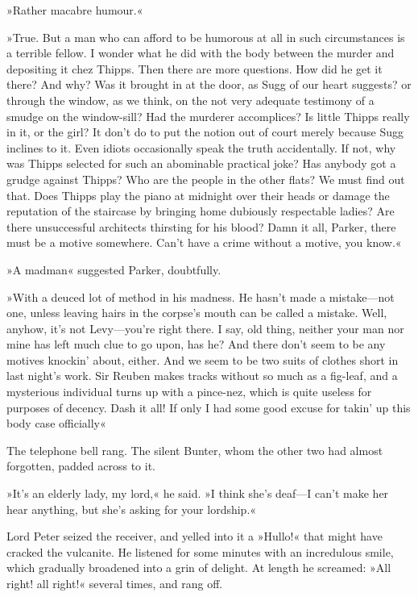 »Rather macabre humour.«

»True. But a man who can afford to be humorous at all in such circumstances is a terrible fellow. I wonder what he did with the body between the murder and depositing it chez Thipps. Then there are more questions. How did he get it there? And why? Was it brought in at the door, as Sugg of our heart suggests? or through the window, as we think, on the not very adequate testimony of a smudge on the window-sill? Had the murderer accomplices? Is little Thipps really in it, or the girl? It don't do to put the notion out of court merely because Sugg inclines to it. Even idiots occasionally speak the truth accidentally. If not, why was Thipps selected for such an abominable practical joke? Has anybody got a grudge against Thipps? Who are the people in the other flats? We must find out that. Does Thipps play the piano at midnight over their heads or damage the reputation of the staircase by bringing home dubiously respectable ladies? Are there unsuccessful architects thirsting for his blood? Damn it all, Parker, there must be a motive somewhere. Can't have a crime without a motive, you know.«

»A madman\longdash« suggested Parker, doubtfully.

»With a deuced lot of method in his madness. He hasn't made a mistake—not one, unless leaving hairs in the corpse's mouth can be called a mistake. Well, anyhow, it's not Levy—you're right there. I say, old thing, neither your man nor mine has left much clue to go upon, has he? And there don't seem to be any motives knockin' about, either. And we seem to be two suits of clothes short in last night's work. Sir Reuben makes tracks without so much as a fig-leaf, and a mysterious individual turns up with a pince-nez, which is quite useless for purposes of decency. Dash it all! If only I had some good excuse for takin' up this body case officially\longdash«

The telephone bell rang. The silent Bunter, whom the other two had almost forgotten, padded across to it.

»It's an elderly lady, my lord,« he said. »I think she's deaf—I can't make her hear anything, but she's asking for your lordship.«

Lord Peter seized the receiver, and yelled into it a »Hullo!« that might have cracked the vulcanite. He listened for some minutes with an incredulous smile, which gradually broadened into a grin of delight. At length he screamed: »All right! all right!« several times, and rang off.

